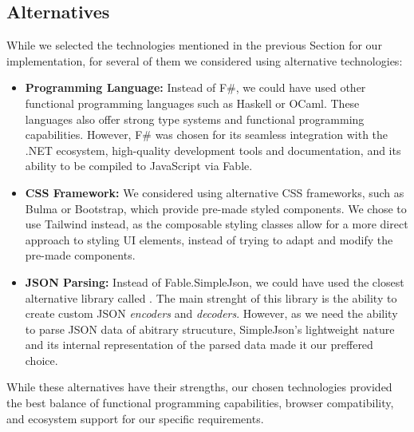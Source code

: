 \subsection{Alternatives}
While we selected the technologies mentioned in the previous Section for our implementation, for several of them we considered using alternative technologies:
\begin{itemize}
	\item \textbf{Programming Language:} Instead of F\#, we could have used other functional programming languages such as Haskell or OCaml.
	      These languages also offer strong type systems and functional programming capabilities.
	      However, F\# was chosen for its seamless integration with the .NET ecosystem, high-quality development tools and documentation, and its ability to be compiled to JavaScript via Fable.

	\item \textbf{CSS Framework:} We considered using alternative CSS frameworks, such as Bulma or Bootstrap, which provide pre-made styled components.
	      We chose to use Tailwind instead, as the composable styling classes allow for a more direct approach to styling UI elements, instead of trying to adapt and modify the pre-made components.

	\item \textbf{JSON Parsing:} Instead of Fable.SimpleJson, we could have used the closest alternative library called \citet{thoth}.
	      The main strenght of this library is the ability to create custom JSON \emph{encoders} and \emph{decoders}.
	      However, as we need the ability to parse JSON data of abitrary strucuture, SimpleJson's lightweight nature and its internal representation of the parsed data made it our preffered choice.
\end{itemize}
While these alternatives have their strengths, our chosen technologies provided the best balance of functional programming capabilities, browser compatibility, and ecosystem support for our specific requirements.



